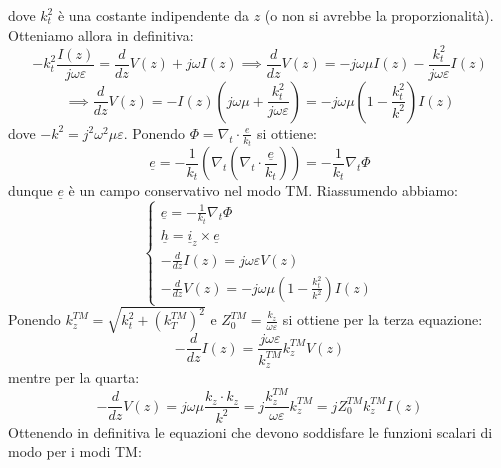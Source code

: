 \documentclass{book}
\begin{document}
    dove $k_{t} ^{2}$ è una costante indipendente da $z$ (o non si avrebbe la proporzionalità). Otteniamo allora
    in definitiva:
    \begin{equation}
        -k_{t} ^{2} \frac{I(z)}{j \omega \varepsilon} = \frac{d}{dz}V(z)+j \omega I(z) \implies \frac{d}{dz}V(z) = -j \omega \mu I(z)-\frac{k_{t} ^{2}}{j \omega \varepsilon}I(z)
    \end{equation}
    \begin{equation}
        \implies \frac{d}{dz}V(z) = -I(z)(j \omega \mu + \frac{k_{t} ^{2}}{j \omega \varepsilon}) = -j \omega \mu (1-\frac{k_{t} ^{2}}{k^{2}})I(z)
    \end{equation}
    dove $-k^{2} = j^{2}\omega^{2}\mu \varepsilon$. Ponendo $\displaystyle \Phi = \nabla_{t} \cdot \frac{e}{k_{t}}$ si ottiene:
    \begin{equation}
        \underline{e} = -\frac{1}{k_{t}}(\nabla_{t} (\nabla_{t} \cdot \frac{\underline{e}}{k_{t}})) = -\frac{1}{k_{t}}\nabla_{t} \Phi
    \end{equation}
    dunque $\underline{e}$ è un campo conservativo nel modo TM.
    Riassumendo abbiamo:
    \begin{equation}
        \begin{cases}
            \displaystyle \underline{e} = -\frac{1}{k_{t}} \nabla_{t} \Phi \\
            \displaystyle \underline{h} = \underline{i}_{z} \times \underline{e} \\
            \displaystyle -\frac{d}{dz}I(z)= j \omega \varepsilon V(z) \\
            \displaystyle -\frac{d}{dz}V(z) = -j \omega \mu (1-\frac{k_{t} ^{2}}{k^{2}})I(z)
        \end{cases}
    \end{equation}
    Ponendo $k_{z} ^{TM} = \displaystyle \sqrt{k^{2} _{t}+(k_{T} ^{TM})^{2}}$ e $Z_{0} ^{TM} = \displaystyle \frac{k_{z}}{\omega \varepsilon}$ si ottiene per la terza equazione:
    \begin{equation}
        -\frac{d}{dz}I(z) = \frac{j \omega \varepsilon}{k_{z} ^{TM}}k_{z} ^{TM} V(z)
    \end{equation}
    mentre per la quarta:
    \begin{equation}
        -\frac{d}{dz}V(z) = j \omega \mu \frac{k_{z} \cdot k_{z}}{k^{2}} = j \frac{k_{z} ^{TM}}{\omega \varepsilon} k_{z} ^{TM} = j Z_{0} ^{TM}k_{z} ^{TM} I(z)
    \end{equation}
    Ottenendo in definitiva le equazioni che devono soddisfare le funzioni scalari di modo per i modi TM:
\end{document}
